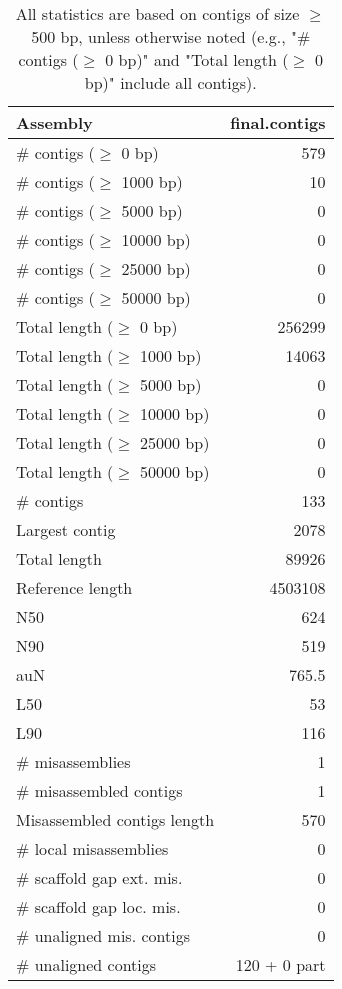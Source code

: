 \documentclass[12pt,a4paper]{article}
\begin{document}
\begin{table}[ht]
\begin{center}
\caption{All statistics are based on contigs of size $\geq$ 500 bp, unless otherwise noted (e.g., "\# contigs ($\geq$ 0 bp)" and "Total length ($\geq$ 0 bp)" include all contigs).}
\begin{tabular}{|l*{1}{|r}|}
\hline
Assembly & final.contigs \\ \hline
\# contigs ($\geq$ 0 bp) & 579 \\ \hline
\# contigs ($\geq$ 1000 bp) & 10 \\ \hline
\# contigs ($\geq$ 5000 bp) & 0 \\ \hline
\# contigs ($\geq$ 10000 bp) & 0 \\ \hline
\# contigs ($\geq$ 25000 bp) & 0 \\ \hline
\# contigs ($\geq$ 50000 bp) & 0 \\ \hline
Total length ($\geq$ 0 bp) & 256299 \\ \hline
Total length ($\geq$ 1000 bp) & 14063 \\ \hline
Total length ($\geq$ 5000 bp) & 0 \\ \hline
Total length ($\geq$ 10000 bp) & 0 \\ \hline
Total length ($\geq$ 25000 bp) & 0 \\ \hline
Total length ($\geq$ 50000 bp) & 0 \\ \hline
\# contigs & 133 \\ \hline
Largest contig & 2078 \\ \hline
Total length & 89926 \\ \hline
Reference length & 4503108 \\ \hline
N50 & 624 \\ \hline
N90 & 519 \\ \hline
auN & 765.5 \\ \hline
L50 & 53 \\ \hline
L90 & 116 \\ \hline
\# misassemblies & 1 \\ \hline
\# misassembled contigs & 1 \\ \hline
Misassembled contigs length & 570 \\ \hline
\# local misassemblies & 0 \\ \hline
\# scaffold gap ext. mis. & 0 \\ \hline
\# scaffold gap loc. mis. & 0 \\ \hline
\# unaligned mis. contigs & 0 \\ \hline
\# unaligned contigs & 120 + 0 part \\ \hline

\end{tabular}
\end{center}
\end{table}
\end{document}
